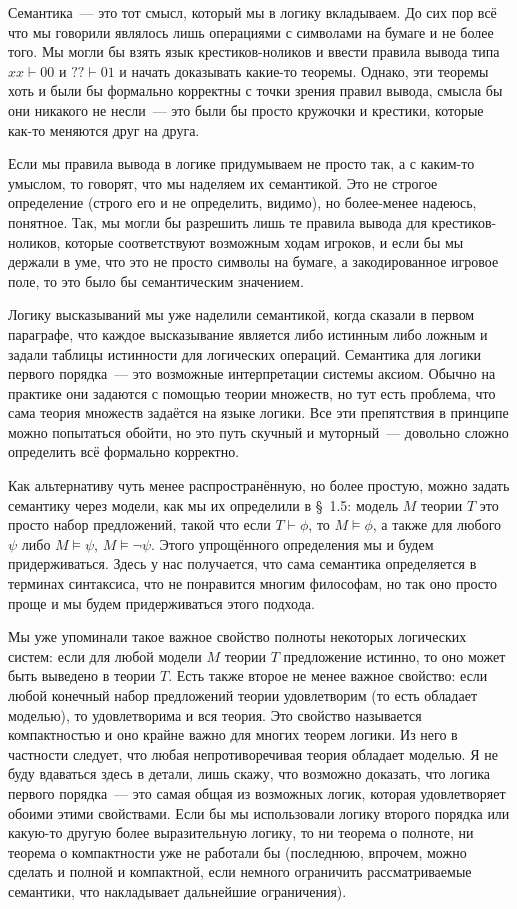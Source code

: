 Семантика~— это тот смысл, который мы в логику вкладываем. До сих пор всё что мы говорили являлось лишь операциями с символами на бумаге и не более того. Мы могли бы взять язык крестиков-ноликов и ввести правила вывода типа $xx\vdash00$ и $??\vdash01$ и начать доказывать какие-то теоремы. Однако, эти теоремы хоть и были бы формально корректны с точки зрения правил вывода, смысла бы они никакого не несли~— это были бы просто кружочки и крестики, которые как-то меняются друг на друга. 

Если мы правила вывода в логике придумываем не просто так, а с каким-то умыслом, то говорят, что мы наделяем их семантикой. Это не строгое определение (строго его и не определить, видимо), но более-менее надеюсь, понятное. Так, мы могли бы разрешить лишь те правила вывода для крестиков-ноликов, которые соответствуют возможным ходам игроков, и если бы мы держали в уме, что это не просто символы на бумаге, а закодированное игровое поле, то это было бы семантическим значением.

Логику высказываний мы уже наделили семантикой, когда сказали в первом параграфе, что каждое высказывание является либо истинным либо ложным и задали таблицы истинности для логических операций. Семантика для логики первого порядка~— это возможные интерпретации системы аксиом. Обычно на практике они задаются с помощью теории множеств, но тут есть проблема, что сама теория множеств задаётся на языке логики. Все эти препятствия в принципе можно попытаться обойти, но это путь скучный и муторный~— довольно сложно определить всё формально корректно.

Как альтернативу чуть менее распространённую, но более простую, можно задать семантику через модели, как мы их определили в \S~1.5: модель $M$ теории $T$ это просто набор предложений, такой что если $T\vdash\phi$, то $M\models \phi$, а также для любого $\psi$ либо $M\models \psi$, $M\models \neg\psi$. Этого упрощённого определения мы и будем придерживаться. Здесь у нас получается, что сама семантика определяется в терминах синтаксиса, что не понравится многим философам, но так оно просто проще и мы будем придерживаться этого подхода.

Мы уже упоминали такое важное свойство полноты некоторых логических систем: если для любой модели $M$ теории $T$ предложение истинно, то оно может быть выведено в теории $T$. Есть также второе не менее важное свойство: если любой конечный набор предложений теории удовлетворим (то есть обладает моделью), то удовлетворима и вся теория. Это свойство называется компактностью и оно крайне важно для многих теорем логики. Из него в частности следует, что любая непротиворечивая теория обладает моделью. Я не буду вдаваться здесь в детали, лишь скажу, что возможно доказать, что логика первого порядка~— это самая общая из возможных логик, которая удовлетворяет обоими этими свойствами. Если бы мы использовали логику второго порядка или какую-то другую более выразительную логику, то ни теорема о полноте, ни теорема о компактности уже не работали бы (последнюю, впрочем, можно сделать и полной и компактной, если немного ограничить рассматриваемые семантики, что накладывает дальнейшие ограничения).

